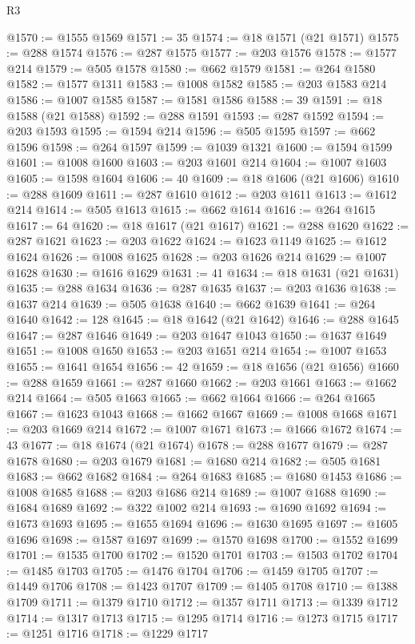 \begin{lexlean}{R3}
\begin{coremodule}
@1570 := @1555 @1569
@1571 := 35
@1574 := @18 @1571 (@21 @1571)
@1575 := @288 @1574
@1576 := @287 @1575
@1577 := @203 @1576
@1578 := @1577 @214
@1579 := @505 @1578
@1580 := @662 @1579
@1581 := @264 @1580
@1582 := @1577 @1311
@1583 := @1008 @1582
@1585 := @203 @1583 @214
@1586 := @1007 @1585
@1587 := @1581 @1586
@1588 := 39
@1591 := @18 @1588 (@21 @1588)
@1592 := @288 @1591
@1593 := @287 @1592
@1594 := @203 @1593
@1595 := @1594 @214
@1596 := @505 @1595
@1597 := @662 @1596
@1598 := @264 @1597
@1599 := @1039 @1321
@1600 := @1594 @1599
@1601 := @1008 @1600
@1603 := @203 @1601 @214
@1604 := @1007 @1603
@1605 := @1598 @1604
@1606 := 40
@1609 := @18 @1606 (@21 @1606)
@1610 := @288 @1609
@1611 := @287 @1610
@1612 := @203 @1611
@1613 := @1612 @214
@1614 := @505 @1613
@1615 := @662 @1614
@1616 := @264 @1615
@1617 := 64
@1620 := @18 @1617 (@21 @1617)
@1621 := @288 @1620
@1622 := @287 @1621
@1623 := @203 @1622
@1624 := @1623 @1149
@1625 := @1612 @1624
@1626 := @1008 @1625
@1628 := @203 @1626 @214
@1629 := @1007 @1628
@1630 := @1616 @1629
@1631 := 41
@1634 := @18 @1631 (@21 @1631)
@1635 := @288 @1634
@1636 := @287 @1635
@1637 := @203 @1636
@1638 := @1637 @214
@1639 := @505 @1638
@1640 := @662 @1639
@1641 := @264 @1640
@1642 := 128
@1645 := @18 @1642 (@21 @1642)
@1646 := @288 @1645
@1647 := @287 @1646
@1649 := @203 @1647 @1043
@1650 := @1637 @1649
@1651 := @1008 @1650
@1653 := @203 @1651 @214
@1654 := @1007 @1653
@1655 := @1641 @1654
@1656 := 42
@1659 := @18 @1656 (@21 @1656)
@1660 := @288 @1659
@1661 := @287 @1660
@1662 := @203 @1661
@1663 := @1662 @214
@1664 := @505 @1663
@1665 := @662 @1664
@1666 := @264 @1665
@1667 := @1623 @1043
@1668 := @1662 @1667
@1669 := @1008 @1668
@1671 := @203 @1669 @214
@1672 := @1007 @1671
@1673 := @1666 @1672
@1674 := 43
@1677 := @18 @1674 (@21 @1674)
@1678 := @288 @1677
@1679 := @287 @1678
@1680 := @203 @1679
@1681 := @1680 @214
@1682 := @505 @1681
@1683 := @662 @1682
@1684 := @264 @1683
@1685 := @1680 @1453
@1686 := @1008 @1685
@1688 := @203 @1686 @214
@1689 := @1007 @1688
@1690 := @1684 @1689
@1692 := @322 @1002 @214
@1693 := @1690 @1692
@1694 := @1673 @1693
@1695 := @1655 @1694
@1696 := @1630 @1695
@1697 := @1605 @1696
@1698 := @1587 @1697
@1699 := @1570 @1698
@1700 := @1552 @1699
@1701 := @1535 @1700
@1702 := @1520 @1701
@1703 := @1503 @1702
@1704 := @1485 @1703
@1705 := @1476 @1704
@1706 := @1459 @1705
@1707 := @1449 @1706
@1708 := @1423 @1707
@1709 := @1405 @1708
@1710 := @1388 @1709
@1711 := @1379 @1710
@1712 := @1357 @1711
@1713 := @1339 @1712
@1714 := @1317 @1713
@1715 := @1295 @1714
@1716 := @1273 @1715
@1717 := @1251 @1716
@1718 := @1229 @1717

\end{coremodule}
\end{lexlean}
